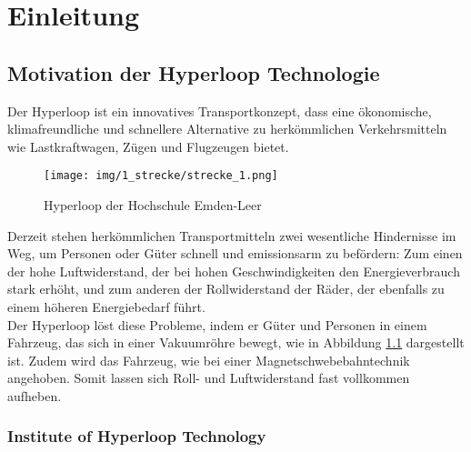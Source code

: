 \chapter{Einleitung}
\label{chapter:Einleitung}

\section{Motivation der Hyperloop Technologie}
\label{section:Motivation}

Der Hyperloop ist ein innovatives Transportkonzept, dass eine ökonomische, klimafreundliche und schnellere Alternative zu herkömmlichen Verkehrsmitteln wie Lastkraftwagen, Zügen und Flugzeugen bietet.\\
\pagebreak[3]
\begin{figure}[!ht]
	\begin{center}
		\texttt{[image: img/1\_strecke/strecke\_1.png]}
		\caption{Hyperloop der Hochschule Emden-Leer}
		\label{img_1_1:strecke}
	\end{center}
\end{figure}
\pagebreak[4]
Derzeit stehen herkömmlichen Transportmitteln zwei wesentliche Hindernisse im Weg, um Personen oder Güter schnell und emissionsarm zu befördern: Zum einen der hohe Luftwiderstand, der bei hohen Geschwindigkeiten den Energieverbrauch stark erhöht, und zum anderen der Rollwiderstand der Räder, der ebenfalls zu einem höheren Energiebedarf führt.\\


Der Hyperloop löst diese Probleme, indem er Güter und Personen in einem Fahrzeug, das sich in einer Vakuumröhre bewegt, wie in Abbildung \ref{img_1_1:strecke} dargestellt ist. Zudem wird das Fahrzeug, wie bei einer Magnetschwebebahntechnik angehoben. Somit lassen sich Roll- und Luftwiderstand fast vollkommen aufheben.






\subsection{Institute of Hyperloop Technology}
\label{section:IHT}

